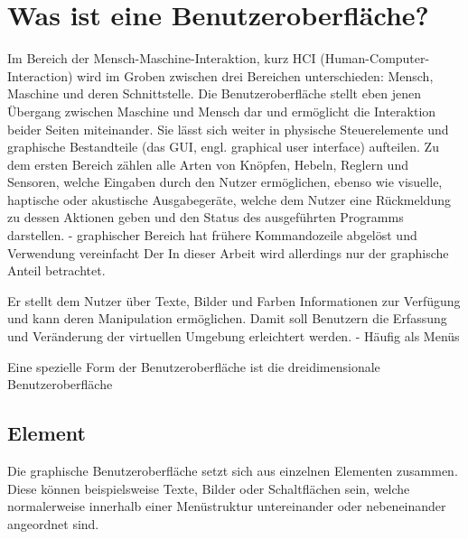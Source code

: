 	\section{Was ist eine Benutzeroberfläche?}
		Im Bereich der Mensch-Maschine-Interaktion, kurz HCI (Human-Computer-Interaction) wird im Groben zwischen drei Bereichen unterschieden: Mensch, Maschine und deren Schnittstelle.\linebreak
		Die Benutzeroberfläche  stellt eben jenen Übergang zwischen Maschine und Mensch dar und ermöglicht die Interaktion beider Seiten miteinander.
		Sie lässt sich weiter in physische Steuerelemente und graphische Bestandteile (das GUI, engl. graphical user interface) aufteilen. Zu dem ersten Bereich zählen alle Arten von Knöpfen, Hebeln, Reglern und Sensoren, welche Eingaben durch den Nutzer ermöglichen, ebenso wie visuelle, haptische oder akustische Ausgabegeräte, welche dem Nutzer eine Rückmeldung zu dessen Aktionen geben und den Status des ausgeführten Programms darstellen.
		- graphischer Bereich hat frühere Kommandozeile abgelöst und Verwendung vereinfacht
		Der 
		In dieser Arbeit wird allerdings nur der graphische Anteil betrachtet.
		
		Er stellt dem Nutzer über Texte, Bilder und Farben Informationen zur Verfügung und kann deren Manipulation ermöglichen. Damit soll Benutzern die Erfassung und Veränderung der virtuellen Umgebung erleichtert werden.
		- Häufig als Menüs
		
		Eine spezielle Form der Benutzeroberfläche ist die dreidimensionale Benutzeroberfläche
	
		\subsection{Element}
			Die graphische Benutzeroberfläche setzt sich aus einzelnen Elementen zusammen. Diese können beispielsweise Texte, Bilder oder Schaltflächen sein, welche normalerweise innerhalb einer Menüstruktur untereinander oder nebeneinander angeordnet sind.
	
